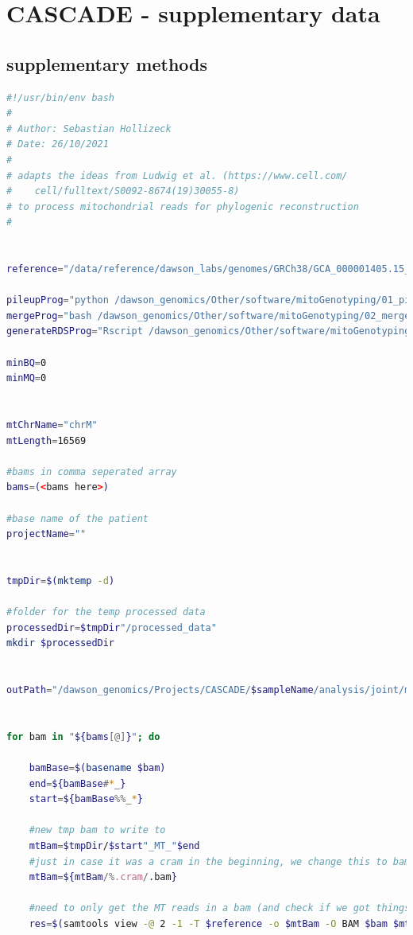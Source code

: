 \chapter[CASCADE - supplementary data]{CASCADE - supplementary data}
\section{supplementary methods}
\label{ch-cascadeSuppMeth}



\begin{lstlisting}[language=bash, caption=Preprocessing of mitochondrial reads and variants for analysis in R, label={lst-cascadeAppendix:mitoPreProcessing}]
#!/usr/bin/env bash
#
# Author: Sebastian Hollizeck
# Date: 26/10/2021
#
# adapts the ideas from Ludwig et al. (https://www.cell.com/
#    cell/fulltext/S0092-8674(19)30055-8)
# to process mitochondrial reads for phylogenic reconstruction
#


reference="/data/reference/dawson_labs/genomes/GRCh38/GCA_000001405.15_GRCh38_full_analysis_set.fna"

pileupProg="python /dawson_genomics/Other/software/mitoGenotyping/01_pileup_counts.py"
mergeProg="bash /dawson_genomics/Other/software/mitoGenotyping/02_merge_pileup_counts.sh"
generateRDSProg="Rscript /dawson_genomics/Other/software/mitoGenotyping/03_makeRDS.R"

minBQ=0
minMQ=0


mtChrName="chrM"
mtLength=16569

#bams in comma seperated array
bams=(<bams here>)

#base name of the patient
projectName=""


tmpDir=$(mktemp -d)

#folder for the temp processed data
processedDir=$tmpDir"/processed_data"
mkdir $processedDir


outPath="/dawson_genomics/Projects/CASCADE/$sampleName/analysis/joint/mito"


for bam in "${bams[@]}"; do

    bamBase=$(basename $bam)
    end=${bamBase#*_}
    start=${bamBase%%_*}

    #new tmp bam to write to
    mtBam=$tmpDir/$start"_MT_"$end
    #just in case it was a cram in the beginning, we change this to bam
    mtBam=${mtBam/%.cram/.bam}

    #need to only get the MT reads in a bam (and check if we got things)
    res=$(samtools view -@ 2 -1 -T $reference -o $mtBam -O BAM $bam $mtChrName --write-index 2>&1)


\end{lstlisting}
